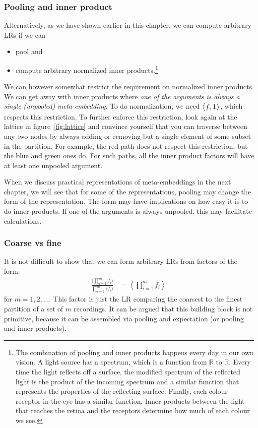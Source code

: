 \documentclass[a4paper,oneside,12pt,english]{report}
\def\expvb#1#2{\left\langle#1\right\rangle_{#2}}
\def\expv#1#2{\bigl\langle#1\bigr\rangle_{#2}}
\def\expp#1{\bigl\langle#1\bigr\rangle}
\def\R{\mathbb{R}}
\def\dot#1#2{\expv{#1,#2}{}}
\def\normal#1{\overline{#1}}
\begin{document}
\subsubsection{Pooling and inner product}
Alternatively, as we have shown earlier in this chapter, we can compute arbitrary LRs if we can
\begin{itemize}
	\item pool and
	\item compute arbitrary normalized inner products.\footnote{The combination of pooling and inner products happens every day in our own vision. A light source has a spectrum, which is a function from $\R$ to $\R$. Every time the light reflects off a surface, the modified spectrum of the reflected light is the product of the incoming spectrum and a similar function that represents the properties of the reflecting surface. Finally, each colour receptor in the eye has a similar function. Inner products between the light that reaches the retina and the receptors determine how much of each colour we see.}
\end{itemize}
We can however somewhat restrict the requirement on normalized inner products. We can get away with inner products where \emph{one of the arguments is always a single (unpooled) meta-embedding}. To do normalization, we need $\dot{f}{\onevec}$, which respects this restriction. To further enforce this restriction, look again at the lattice in figure~\ref{fig:lattice} and convince yourself that you can traverse between any two nodes by always adding or removing but a single element of some subset in the partition. For example, the red path does not respect this restriction, but the blue and green ones do. For such paths, all the inner product factors will have at least one unpooled argument.

When we discuss practical representations of meta-embeddings in the next chapter, we will see that for some of the representations, pooling may change the form of the representation. The form may have implications on how easy it is to do inner products. If one of the arguments is always unpooled, this may facilitate calculations.


\subsubsection{Coarse vs fine}
It is not difficult to show that we can form arbitrary LRs from factors of the form:
\begin{align}
\frac{\expp{\prod_{i=1}^m f_i}}{\prod_{i=1}^m\expp{f_i}} &= \expvb{\prod_{i=1}^m \normal{f_i}}{}
\end{align}  
for $m=1,2,\ldots$. This factor is just the LR comparing the coarsest to the finest partition of a set of $m$ recordings. It can be argued that this building block is not primitive, because it can be assembled via pooling and expectation (or pooling and inner products).
\end{document}

